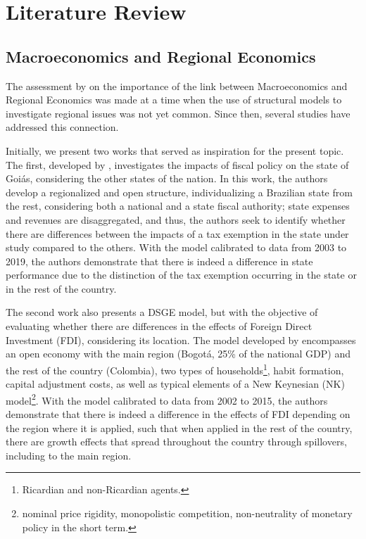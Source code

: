 \documentclass[
thesis.tex
]{subfiles}
\begin{document}
	
	\newpage
	
	\section{Literature Review}\label{sec:literature-review}
	
	\subsection*{Macroeconomics and Regional Economics}
	
	The assessment by \textcite{rickman_modern_2010} on the importance of the link between Macroeconomics and Regional Economics was made at a time when the use of structural models to investigate regional issues was not yet common. Since then, several studies have addressed this connection.
	
	Initially, we present two works that served as inspiration for the present topic. The first, developed by \textcite{costa_junior_dsge_2022}, investigates the impacts of fiscal policy on the state of Goiás, considering the other states of the nation. In this work, the authors develop a regionalized and open structure, individualizing a Brazilian state from the rest, considering both a national and a state fiscal authority; state expenses and revenues are disaggregated, and thus, the authors seek to identify whether there are differences between the impacts of a tax exemption in the state under study compared to the others. With the model calibrated to data from 2003 to 2019, the authors demonstrate that there is indeed a difference in state performance due to the distinction of the tax exemption occurring in the state or in the rest of the country.
	
	The second work also presents a DSGE model, but with the objective of evaluating whether there are differences in the effects of Foreign Direct Investment (FDI), considering its location. The model developed by \textcite{mora_fdi_2019} encompasses an open economy with the main region (Bogotá, 25\% of the national GDP) and the rest of the country (Colombia), two types of households\footnote{ Ricardian and non-Ricardian agents.}, habit formation, capital adjustment costs, as well as typical elements of a New Keynesian (NK) model\footnote{ nominal price rigidity, monopolistic competition, non-neutrality of monetary policy in the short term.}. With the model calibrated to data from 2002 to 2015, the authors demonstrate that there is indeed a difference in the effects of FDI depending on the region where it is applied, such that when applied in the rest of the country, there are growth effects that spread throughout the country through spillovers, including to the main region.
	
\end{document}
